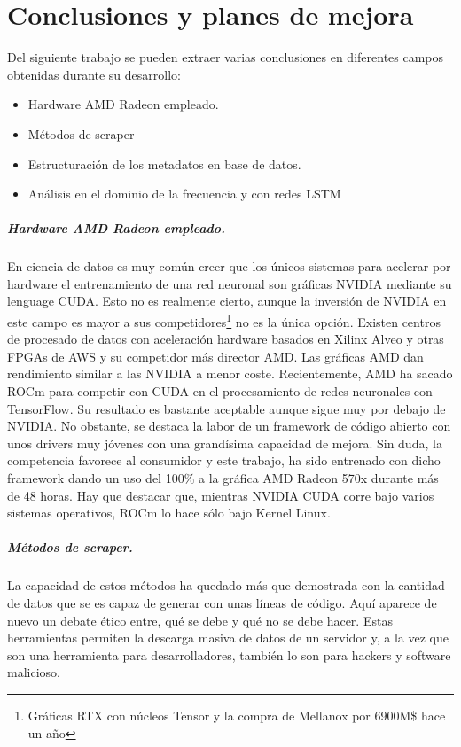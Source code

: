 \chapter{Conclusiones y planes de mejora}
Del siguiente trabajo se pueden extraer varias conclusiones en diferentes campos obtenidas durante su desarrollo:
\begin{itemize}
	\item Hardware \gls{AMD} Radeon empleado.
	\item Métodos de \gls{scraper}
	\item Estructuración de los metadatos en base de datos.
	\item Análisis en el dominio de la frecuencia y con redes \gls{LSTM}
\end{itemize}
\paragraph{Hardware \gls{AMD} Radeon empleado.} En ciencia de datos es muy común creer que los únicos sistemas para acelerar por hardware el entrenamiento de una red neuronal son gráficas NVIDIA mediante su lenguage CUDA. Esto no es realmente cierto, aunque la inversión de NVIDIA en este campo es mayor a sus competidores\footnote{Gráficas RTX con núcleos Tensor y la compra de Mellanox por 6900M\$ hace un año} no es la única opción. Existen centros de procesado de datos con aceleración hardware basados en Xilinx Alveo y otras \glspl{FPGA} de \gls{AWS} y su competidor más director \gls{AMD}. Las gráficas \gls{AMD} dan rendimiento similar a las NVIDIA a menor coste. Recientemente, \gls{AMD} ha sacado \gls{ROCm} para competir con CUDA en el procesamiento de redes neuronales con TensorFlow. Su resultado es bastante aceptable aunque sigue muy por debajo de NVIDIA. No obstante, se destaca la labor de un framework de código abierto con unos drivers muy jóvenes con una grandísima capacidad de mejora. Sin duda, la competencia favorece al consumidor y este trabajo, ha sido entrenado con dicho framework dando un uso del 100\% a la gráfica \gls{AMD} Radeon 570x durante más de 48 horas. Hay que destacar que, mientras NVIDIA CUDA corre bajo varios sistemas operativos, \gls{ROCm} lo hace sólo bajo Kernel Linux\cite{rocm}.

\paragraph{Métodos de \gls{scraper}.} La capacidad de estos métodos ha quedado más que demostrada con la cantidad de datos que se es capaz de generar con unas líneas de código. Aquí aparece de nuevo un debate ético entre, qué se debe y qué no se debe hacer. Estas herramientas permiten la descarga masiva de datos de un servidor y, a la vez que son una herramienta para desarrolladores, también lo son para hackers y software malicioso.

